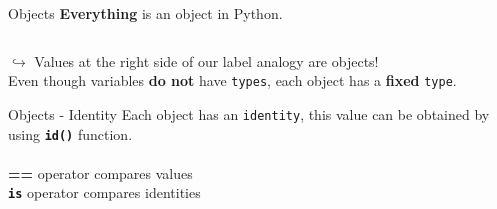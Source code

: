     \begin{frame}{Objects}
        \LARGE
        \textbf{Everything} is an object in Python.
        \\
        \begin{columns}
            \begin{column}[c]{0.5\textwidth}
                \LARGE
            \end{column}
            \begin{column}[c]{0.5\textwidth}
           \end{column}
       \end{columns}
       \medskip
        $\hookrightarrow$ Values at the right side of our label analogy are
        objects!\\
        \pause
         Even though variables \textbf{do not} have \texttt{types}, each object has a \textbf{fixed} \texttt{type}.
    \end{frame}

    \begin{frame}[c]{Objects - Identity}
        \Large
        Each object has an \texttt{identity},
        \pause
         this value can be obtained by using \texttt{\textbf{id()}} function.\\
        \pause
        \\
        \textbf{==} operator compares values \\\textbf{\texttt{is}} operator compares identities 
    \end{frame}
    
